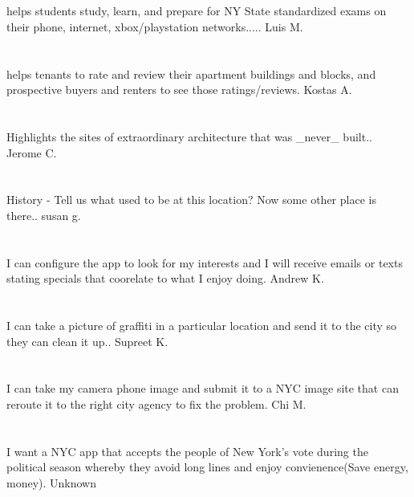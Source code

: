 \section{}helps students study,  learn,  and prepare for NY State standardized exams on their phone,  internet,  xbox/playstation networks..... Luis M.
\section{}helps tenants to rate and review their apartment buildings and blocks,  and prospective buyers and renters to see those ratings/reviews. Kostas A.
\section{} Highlights the sites of extraordinary architecture that was \_never\_ built.. Jerome C.
\section{}  History - Tell us what used to be at this location? Now some other place is there.. susan g.
\section{}I can configure the app to look for my interests and I will receive emails or texts stating specials that coorelate to what I enjoy doing. Andrew K.
\section{}I can take a picture of graffiti in a particular location and send it to the city so they can clean it up.. Supreet K.
\section{}I can take my camera phone image and submit it to a NYC image site that can reroute it to the right city agency to fix the problem. Chi  M.
\section{} I want a NYC app that accepts the people of New York's vote during the political season whereby they avoid long lines and enjoy convienence(Save energy,  money).  Unknown
